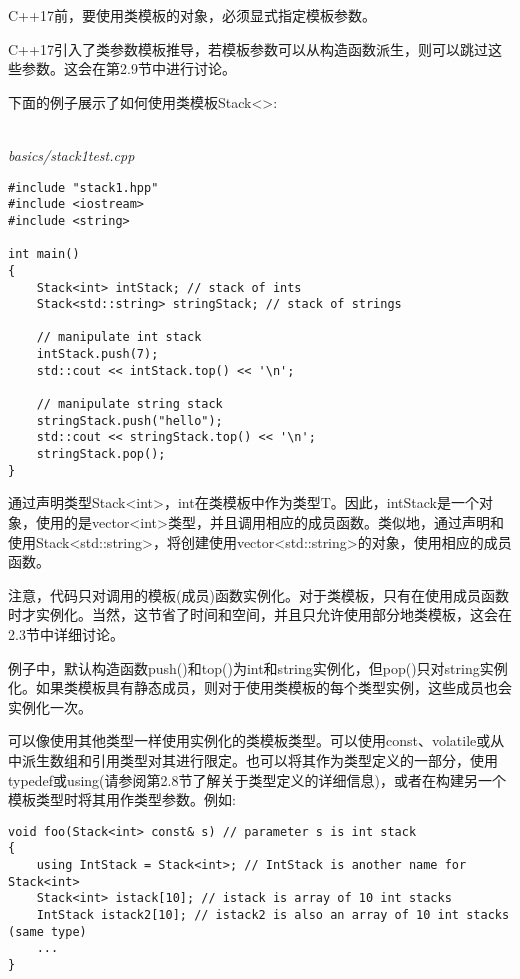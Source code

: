 C++17前，要使用类模板的对象，必须显式指定模板参数。

\begin{tcolorbox}[colback=webgreen!5!white,colframe=webgreen!75!black]
\hspace*{0.75cm}C++17引入了类参数模板推导，若模板参数可以从构造函数派生，则可以跳过这些参数。这会在第2.9节中进行讨论。
\end{tcolorbox}

下面的例子展示了如何使用类模板Stack<>:

\hspace*{\fill} \\ %
\noindent
\textit{basics/stack1test.cpp}
\begin{lstlisting}[style=styleCXX]
#include "stack1.hpp"
#include <iostream>
#include <string>

int main()
{
	Stack<int> intStack; // stack of ints
	Stack<std::string> stringStack; // stack of strings
	
	// manipulate int stack
	intStack.push(7);
	std::cout << intStack.top() << '\n';
	
	// manipulate string stack
	stringStack.push("hello");
	std::cout << stringStack.top() << '\n';
	stringStack.pop();
}
\end{lstlisting}

通过声明类型Stack<int>，int在类模板中作为类型T。因此，intStack是一个对象，使用的是vector<int>类型，并且调用相应的成员函数。类似地，通过声明和使用Stack<std::string>，将创建使用vector<std::string>的对象，使用相应的成员函数。

注意，代码只对调用的模板(成员)函数实例化。对于类模板，只有在使用成员函数时才实例化。当然，这节省了时间和空间，并且只允许使用部分地类模板，这会在2.3节中详细讨论。

例子中，默认构造函数push()和top()为int和string实例化，但pop()只对string实例化。如果类模板具有静态成员，则对于使用类模板的每个类型实例，这些成员也会实例化一次。

可以像使用其他类型一样使用实例化的类模板类型。可以使用const、volatile或从中派生数组和引用类型对其进行限定。也可以将其作为类型定义的一部分，使用typedef或using(请参阅第2.8节了解关于类型定义的详细信息)，或者在构建另一个模板类型时将其用作类型参数。例如:

\begin{lstlisting}[style=styleCXX]
void foo(Stack<int> const& s) // parameter s is int stack
{
	using IntStack = Stack<int>; // IntStack is another name for Stack<int>
	Stack<int> istack[10]; // istack is array of 10 int stacks
	IntStack istack2[10]; // istack2 is also an array of 10 int stacks (same type)
	...
}
\end{lstlisting}

